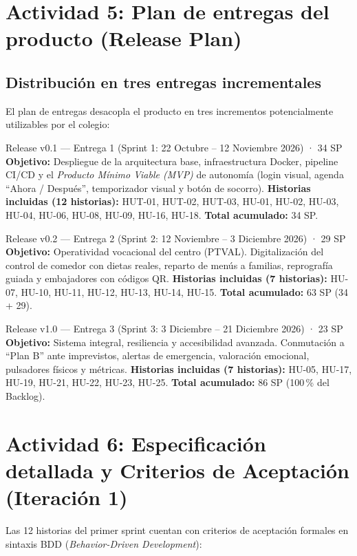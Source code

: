 \documentclass[11pt,a4paper]{article}
\begin{document}
\section{Actividad 5: Plan de entregas del producto (Release Plan)}
\subsection{Distribución en tres entregas incrementales}
El plan de entregas desacopla el producto en tres incrementos potencialmente utilizables por el colegio:

\begin{verde}{Release v0.1 — Entrega 1 (Sprint 1: 22 Octubre – 12 Noviembre 2026) · 34 SP}
\textbf{Objetivo:} Despliegue de la arquitectura base, infraestructura Docker, pipeline CI/CD y el \textit{Producto Mínimo Viable (MVP)} de autonomía (login visual, agenda ``Ahora / Después'', temporizador visual y botón de socorro). \textbf{Historias incluidas (12 historias):} HUT-01, HUT-02, HUT-03, HU-01, HU-02, HU-03, HU-04, HU-06, HU-08, HU-09, HU-16, HU-18. \textbf{Total acumulado:} 34 SP.
\end{verde}
\begin{verde}{Release v0.2 — Entrega 2 (Sprint 2: 12 Noviembre – 3 Diciembre 2026) · 29 SP}
\textbf{Objetivo:} Operatividad vocacional del centro (PTVAL). Digitalización del control de comedor con dietas reales, reparto de menús a familias, reprografía guiada y embajadores con códigos QR. \textbf{Historias incluidas (7 historias):} HU-07, HU-10, HU-11, HU-12, HU-13, HU-14, HU-15. \textbf{Total acumulado:} 63 SP (34 + 29).
\end{verde}
\begin{verde}{Release v1.0 — Entrega 3 (Sprint 3: 3 Diciembre – 21 Diciembre 2026) · 23 SP}
\textbf{Objetivo:} Sistema integral, resiliencia y accesibilidad avanzada. Conmutación a ``Plan B'' ante imprevistos, alertas de emergencia, valoración emocional, pulsadores físicos y métricas. \textbf{Historias incluidas (7 historias):} HU-05, HU-17, HU-19, HU-21, HU-22, HU-23, HU-25. \textbf{Total acumulado:} 86 SP (100\,\% del Backlog).
\end{verde}

\section{Actividad 6: Especificación detallada y Criterios de Aceptación (Iteración 1)}
Las 12 historias del primer sprint cuentan con criterios de aceptación formales en sintaxis BDD (\textit{Behavior-Driven Development}):
\end{document}
